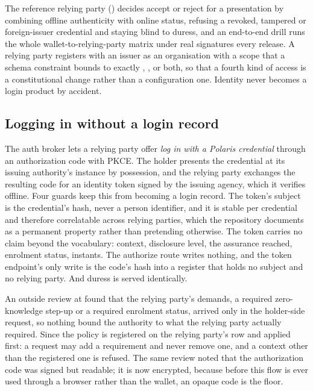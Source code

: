 The reference relying party () decides accept or reject for a
presentation by combining offline authenticity with online status, refusing a revoked, tampered or
foreign-issuer credential and staying blind to duress, and an end-to-end drill runs the whole
wallet-to-relying-party matrix under real signatures every release. A relying party registers with
an issuer as an organisation with a scope that a schema constraint bounds to exactly ,
, or both, so that a fourth kind of access is a constitutional change rather than
a configuration one. Identity never becomes a login product by accident. \sImpl

\subsection{Logging in without a login record}

The auth broker lets a relying party offer \emph{log in with a Polaris credential} through an
authorization code with PKCE. The holder presents the credential at its issuing authority's
instance by possession, and the relying party exchanges the resulting code for an identity token
signed by the issuing agency, which it verifies offline. Four guards keep this from becoming a login
record. The token's subject is the credential's hash, never a person identifier, and it is stable
per credential and therefore correlatable across relying parties, which the repository documents as
a permanent property rather than pretending otherwise. The token carries no claim beyond the
vocabulary: context, disclosure level, the assurance reached, enrolment status, instants. The
authorize route writes nothing, and the token endpoint's only write is the code's hash into a
register that holds no subject and no relying party. And duress is served identically. \sImpl

An outside review at  found that the relying party's demands, a required
zero-knowledge step-up or a required enrolment status, arrived only in the holder-side request, so
nothing bound the authority to what the relying party actually required. Since  the
policy is registered on the relying party's row and applied first: a request may add a requirement
and never remove one, and a context other than the registered one is refused. The same review noted
that the authorization code was signed but readable; it is now encrypted, because before this flow
is ever used through a browser rather than the wallet, an opaque code is the floor. \sImpl

